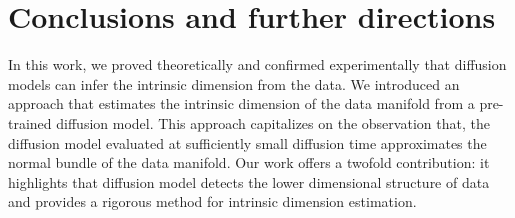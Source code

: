     \begin{table}[ht]
    \centering
    \vspace{8pt} %
    \caption{Comparison of dimensionality detection methods on various data manifolds.}
    \label{ch3:tbl:results}
    \end{table}
    

\section{Conclusions and further directions}
\label{ch3:sec:conclusions}
In this work, we proved theoretically and confirmed experimentally that diffusion models can infer the intrinsic dimension from the data. We introduced an approach that estimates the intrinsic dimension of the data manifold from a pre-trained diffusion model. This approach capitalizes on the observation that, the diffusion model evaluated at sufficiently small diffusion time approximates the normal bundle of the data manifold.  Our work offers a twofold contribution: it highlights that diffusion model detects the lower dimensional structure of data and provides a rigorous method for intrinsic dimension estimation. 


